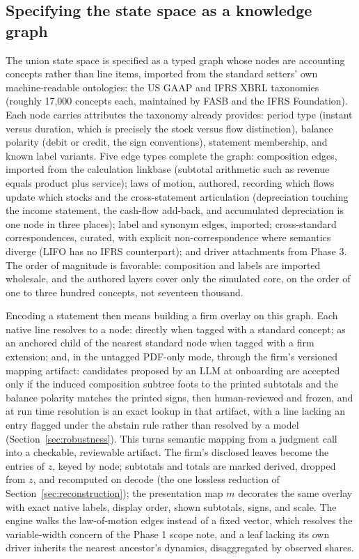 \documentclass[11pt]{article}
\begin{document}
\subsection{Specifying the state space as a knowledge graph}
\label{sec:kg}
The union state space is specified as a typed graph whose nodes are accounting concepts rather than line items, imported from the standard setters' own machine-readable ontologies: the US GAAP and IFRS XBRL taxonomies (roughly 17{,}000 concepts each, maintained by FASB and the IFRS Foundation). Each node carries attributes the taxonomy already provides: period type (instant versus duration, which is precisely the stock versus flow distinction), balance polarity (debit or credit, the sign conventions), statement membership, and known label variants. Five edge types complete the graph: composition edges, imported from the calculation linkbase (subtotal arithmetic such as revenue equals product plus service); laws of motion, authored, recording which flows update which stocks and the cross-statement articulation (depreciation touching the income statement, the cash-flow add-back, and accumulated depreciation is one node in three places); label and synonym edges, imported; cross-standard correspondences, curated, with explicit non-correspondence where semantics diverge (LIFO has no IFRS counterpart); and driver attachments from Phase 3. The order of magnitude is favorable: composition and labels are imported wholesale, and the authored layers cover only the simulated core, on the order of one to three hundred concepts, not seventeen thousand.

Encoding a statement then means building a firm overlay on this graph. Each native line resolves to a node: directly when tagged with a standard concept; as an anchored child of the nearest standard node when tagged with a firm extension; and, in the untagged PDF-only mode, through the firm's versioned mapping artifact: candidates proposed by an LLM at onboarding are accepted only if the induced composition subtree foots to the printed subtotals and the balance polarity matches the printed signs, then human-reviewed and frozen, and at run time resolution is an exact lookup in that artifact, with a line lacking an entry flagged under the abstain rule rather than resolved by a model (Section~\ref{sec:robustness}). This turns semantic mapping from a judgment call into a checkable, reviewable artifact. The firm's disclosed leaves become the entries of $z$, keyed by node; subtotals and totals are marked derived, dropped from $z$, and recomputed on decode (the one lossless reduction of Section~\ref{sec:reconstruction}); the presentation map $m$ decorates the same overlay with exact native labels, display order, shown subtotals, signs, and scale. The engine walks the law-of-motion edges instead of a fixed vector, which resolves the variable-width concern of the Phase 1 scope note, and a leaf lacking its own driver inherits the nearest ancestor's dynamics, disaggregated by observed shares.
\end{document}
